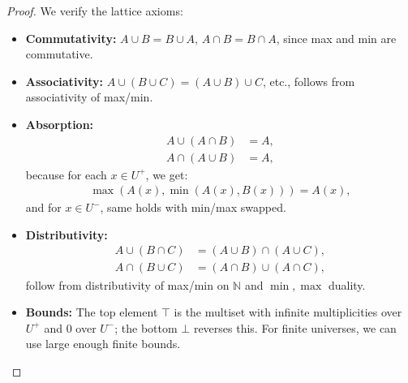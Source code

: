 \documentclass{article}
\theoremstyle{plain}
\theoremstyle{definition}
\theoremstyle{remark}
\newcommand{\Nat}{\mathbb{N}}
\begin{document}
\begin{proof}
	We verify the lattice axioms:
	
	\begin{itemize}
		\item \textbf{Commutativity:} \(A \cup B = B \cup A\), \(A \cap B = B \cap A\), since max and min are commutative.
		
		\item \textbf{Associativity:} \(A \cup (B \cup C) = (A \cup B) \cup C\), etc., follows from associativity of max/min.
		
		\item \textbf{Absorption:}
		\begin{align*}
			A \cup (A \cap B) &= A, \\
			A \cap (A \cup B) &= A,
		\end{align*}
		because for each \(x \in U^+\), we get:
		\begin{align*}
			\max(A(x), \min(A(x), B(x))) = A(x),
		\end{align*}
		and for \(x \in U^-\), same holds with min/max swapped.
		
		\item \textbf{Distributivity:}
		\begin{align*}
			A \cup (B \cap C) &= (A \cup B) \cap (A \cup C), \\
			A \cap (B \cup C) &= (A \cap B) \cup (A \cap C),
		\end{align*}
		follow from distributivity of max/min on \(\Nat\) and \(\min, \max\) duality.
		
		\item \textbf{Bounds:} The top element \(\top\) is the multiset with infinite multiplicities over \(U^+\) and 0 over \(U^-\); the bottom \(\bot\) reverses this. For finite universes, we can use large enough finite bounds.
	\end{itemize}
\end{proof}
\end{document}
